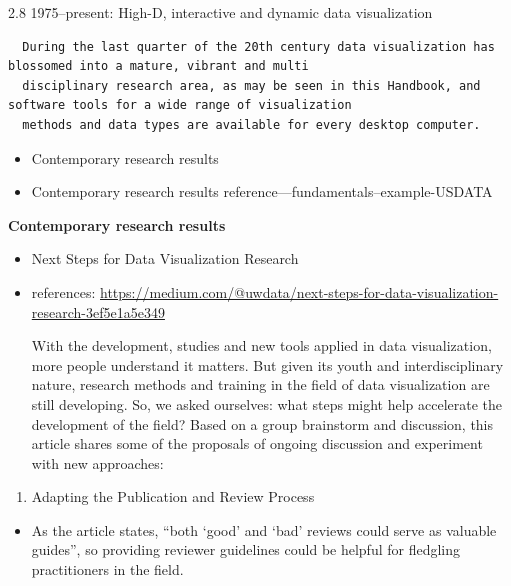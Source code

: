 \documentclass[]{book}
\providecommand{\tightlist}{%
  \setlength{\itemsep}{0pt}\setlength{\parskip}{0pt}}
\theoremstyle{definition}
\theoremstyle{definition}
\theoremstyle{definition}
\theoremstyle{remark}
\begin{document}
\begin{enumerate}
  2.8 1975--present: High-D, interactive and dynamic data visualization

\begin{verbatim}
  During the last quarter of the 20th century data visualization has blossomed into a mature, vibrant and multi
  disciplinary research area, as may be seen in this Handbook, and software tools for a wide range of visualization
  methods and data types are available for every desktop computer.
\end{verbatim}
\end{enumerate}

\begin{itemize}
\tightlist
\item
  Contemporary research results
\item
  Contemporary research results reference---fundamentals--example-USDATA
\end{itemize}

\textbf{Contemporary research results}

\begin{itemize}
\item
  Next Steps for Data Visualization Research
\item
  references:
  \url{https://medium.com/@uwdata/next-steps-for-data-visualization-research-3ef5e1a5e349}

  With the development, studies and new tools applied in data
  visualization, more people understand it matters. But given its youth
  and interdisciplinary nature, research methods and training in the
  field of data visualization are still developing. So, we asked
  ourselves: what steps might help accelerate the development of the
  field? Based on a group brainstorm and discussion, this article shares
  some of the proposals of ongoing discussion and experiment with new
  approaches:
\end{itemize}

\begin{enumerate}
\def\labelenumi{\arabic{enumi}.}
\tightlist
\item
  Adapting the Publication and Review Process
\end{enumerate}

\begin{itemize}
\tightlist
\item
  As the article states, ``both `good' and `bad' reviews could serve as
  valuable guides'', so providing reviewer guidelines could be helpful
  for fledgling practitioners in the field.
\end{itemize}
\end{document}
